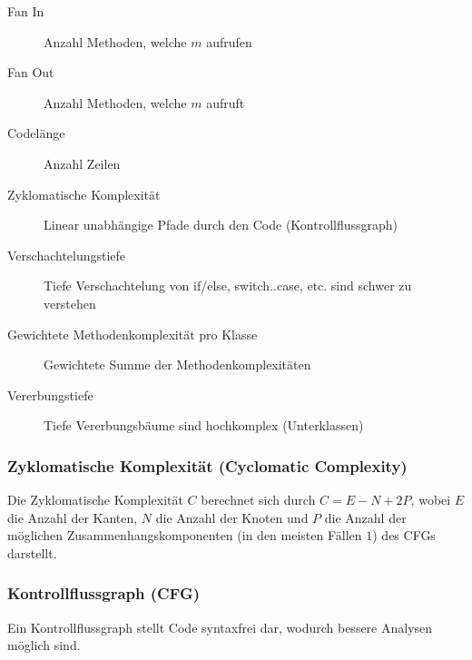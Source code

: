 \documentclass[ngerman,color=3b]{tuda_summary}
\begin{document}
\begin{description}
    \item[Fan In] Anzahl Methoden, welche $ m $ aufrufen
    \item[Fan Out] Anzahl Methoden, welche $ m $ aufruft
    \item[Codelänge] Anzahl Zeilen
    \item[Zyklomatische Komplexität] Linear unabhängige Pfade durch den Code (Kontrollflussgraph)
    \item[Verschachtelungstiefe] Tiefe Verschachtelung von if/else, switch..case, etc. sind schwer zu verstehen
    \item[Gewichtete Methodenkomplexität pro Klasse] Gewichtete Summe der Methodenkomplexitäten
    \item[Vererbungstiefe] Tiefe Vererbungsbäume sind hochkomplex (Unterklassen)
\end{description}

\subsubsection{Zyklomatische Komplexität (Cyclomatic Complexity)}
Die Zyklomatische Komplexität $ C $ berechnet sich durch $ C = E - N + 2P $, wobei $ E $ die Anzahl der Kanten, $ N $ die Anzahl der Knoten und $ P $ die Anzahl der möglichen Zusammenhangskomponenten (in den meisten Fällen $ 1 $) des CFGs darstellt.

\subsubsection{Kontrollflussgraph (CFG)}
\label{diagram:cfg}

Ein Kontrollflussgraph stellt Code syntaxfrei dar, wodurch bessere Analysen möglich sind.
\end{document}
